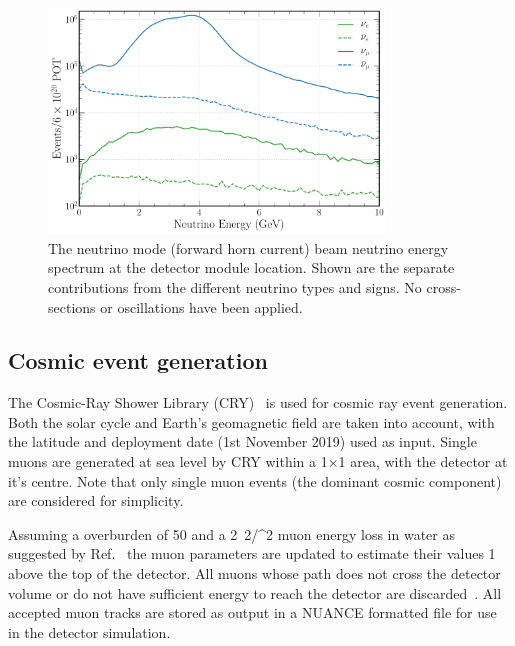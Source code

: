 \begin{figure} %
    \includegraphics[width=0.8\textwidth]{diagrams/4-chips/flux.pdf}
    \caption[\numi neutrino flux at CHIPS.]
    {The neutrino mode (forward horn current) \numi beam neutrino energy spectrum at the
        \chipsfive detector module location. Shown are the separate contributions from the
        different neutrino types and signs. No cross-sections or oscillations have been applied.}
    \label{fig:flux}
\end{figure}

\subsection{Cosmic event generation} %
\label{sec:chips_monte_carlo_cosmic} %

The Cosmic-Ray Shower Library (CRY)~\cite{hagmann2012_1, hagmann2012_2} is used for cosmic ray
event generation. Both the solar cycle and Earth's geomagnetic field are taken into account, with
the \chipsfive latitude and deployment date (1st November 2019) used as input. Single muons are
generated at sea level by CRY within a \unit{1}{}$\times$\unit{1}{} area,
with the detector at it's centre. Note that only single muon events (the dominant cosmic
component) are considered for simplicity.

Assuming a \chipsfive overburden of \unit{50}{} and a \unit{2.2}{\MeV/^{2}}
muon energy loss in water as suggested by Ref.~\cite{klimushin2001} the muon parameters are
updated to estimate their values \unit{1}{} above the top of the detector. All muons
whose path does not cross the detector volume or do not have sufficient energy to reach the
detector are discarded~\cite{chipsgen2020}. All accepted muon tracks are stored as output in a
NUANCE formatted file for use in the detector simulation.


